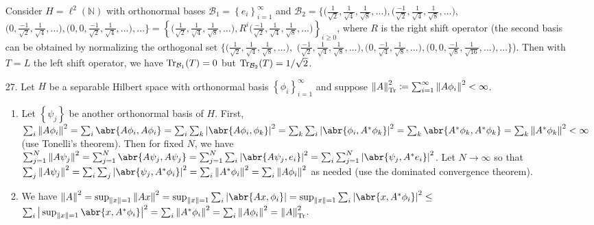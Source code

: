 \documentclass[11pt,leqno]{article}
\theoremstyle{plain}
\theoremstyle{definition}
\numberwithin{equation}{section}
\numberwithin{lem}{section}
\newcommand{\cbr}[1]{\left\{#1\right\}}
\begin{document}
\begin{enumerate}
    Consider $H = \ell^2(\mathbb N)$ with orthonormal bases $\mathcal B_1 = \cbr{e_i}_{i=1}^\infty$ and $\mathcal B_2 =\Big\{\Big(\frac{1}{\sqrt{2}}, \frac{1}{\sqrt{4}}, \frac{1}{\sqrt{8}}, \dots\Big), \Big(\frac{-1}{\sqrt{2}}, \frac{1}{\sqrt{4}}, \frac{1}{\sqrt{8}}, \dots\Big)$,
    $\Big(0, \frac{-1}{\sqrt{2}}, \frac{1}{\sqrt{4}}, \dots\Big), \Big(0, 0, \frac{-1}{\sqrt{2}}, \frac{1}{\sqrt{4}}, \dots\Big), \dots\Big\} = \cbr{\Big(\frac{1}{\sqrt{2}}, \frac{1}{\sqrt{4}}, \frac{1}{\sqrt{8}}, \dots\Big), R^i\Big(\frac{-1}{\sqrt{2}}, \frac{1}{\sqrt{4}}, \frac{1}{\sqrt{8}}, \dots\Big)}_{i\geq 0}$, where $R$ is the right shift operator (the second basis can be obtained by normalizing the orthogonal set $\Big\{\Big(\frac{1}{\sqrt{2}}, \frac{1}{\sqrt{4}}, \frac{1}{\sqrt{8}}, \dots\Big),$
    $\Big(\frac{-1}{\sqrt{2}}, \frac{1}{\sqrt{4}}, \frac{1}{\sqrt{8}}, \dots\Big),\Big(0, \frac{-1}{\sqrt{4}}, \frac{1}{\sqrt{8}}, \dots\Big), \Big(0, 0, \frac{-1}{\sqrt{8}}, \frac{1}{\sqrt{16}}, \dots\Big), \dots\Big\}$). Then with $T = L$ the left shift operator, we have $\Tr_{\mathcal B_1}(T) = 0$ but $\Tr_{\mathcal B_2}(T) = 1/\sqrt{2}$.
    \item[27.] Let $H$ be a separable Hilbert space with orthonormal basis $\cbr{\phi_i}_{i=1}^\infty$ and suppose $\norm{A}_{\Tr}^2\coloneqq \sum_{i=1}^\infty \norm{A\phi_i}^2<\infty$.
    \begin{enumerate}
      \item Let $\cbr{\psi_j}$ be another orthonormal basis of $H$. First, $\sum_i\norm{A\phi_i}^2 = \sum_i\abr{A\phi_i,A\phi_i} = \sum_i\sum_k\abs{\abr{A\phi_i,\phi_k}}^2 = \sum_k\sum_i\abs{\abr{\phi_i,A^\ast\phi_k}}^2 = \sum_k\abr{A^\ast\phi_k,A^\ast\phi_k} = \sum_k \norm{A^\ast \phi_k}^2 < \infty$ (use Tonelli's theorem). Then for fixed $N$, we have $\sum_{j=1}^N \norm{A\psi_j}^2 = \sum_{j=1}^N\abr{A\psi_j,A\psi_j} = \sum_{j=1}^N\sum_i\abs{\abr{A\psi_j,e_i}}^2 = \sum_i\sum_{j=1}^N\abs{\abr{\psi_j,A^\ast e_i}}^2$. Let $N\to\infty$ so that $\sum_j \norm{A\psi_j}^2 = \sum_i\sum_j\abs{\abr{\psi_j,A^\ast \phi_i}}^2 = \sum_i \norm{A^\ast \phi_i}^2 = \sum_i \norm{A \phi_i}^2$ as needed (use the dominated convergence theorem).
      \item We have $\norm{A}^2 = \sup_{\norm{x} = 1}\norm{Ax}^2 = \sup_{\norm{x} = 1}\sum_i \abs{\abr{Ax,\phi_i}} = \sup_{\norm{x} = 1}\sum_i \abs{\abr{x,A^\ast\phi_i}}^2\leq$\\
      $\sum_i \big|\sup_{\norm{x} = 1}\abr{x,A^\ast\phi_i}\big|^2 = \sum_i\norm{A^\ast\phi_i}^2 = \sum_i\norm{A\phi_i}^2 = \norm{A}_{\Tr}^2$.
    \end{enumerate}

\end{enumerate}
\end{document}
